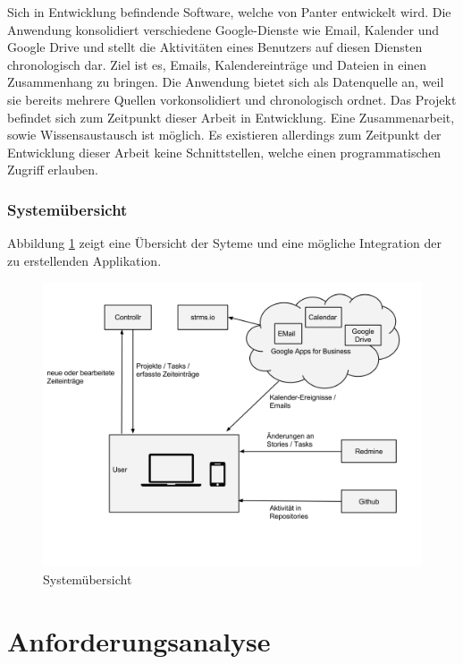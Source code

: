 \documentclass[]{article}
\begin{document}
Sich in Entwicklung befindende Software, welche von Panter entwickelt
wird. Die Anwendung konsolidiert verschiedene Google-Dienste wie Email,
Kalender und Google Drive und stellt die Aktivitäten eines Benutzers auf
diesen Diensten chronologisch dar. Ziel ist es, Emails, Kalendereinträge
und Dateien in einen Zusammenhang zu bringen. Die Anwendung bietet sich
als Datenquelle an, weil sie bereits mehrere Quellen vorkonsolidiert und
chronologisch ordnet. Das Projekt befindet sich zum Zeitpunkt dieser
Arbeit in Entwicklung. Eine Zusammenarbeit, sowie Wissensaustausch ist
möglich. Es existieren allerdings zum Zeitpunkt der Entwicklung dieser
Arbeit keine Schnittstellen, welche einen programmatischen Zugriff
erlauben.

\subsubsection{Systemübersicht}\label{systemuxfcbersicht}

Abbildung \ref{figSystems} zeigt eine Übersicht der Syteme und eine
mögliche Integration der zu erstellenden Applikation.

\begin{figure}[htbp]
\centering
\includegraphics{../img/systems.png}
\caption{Systemübersicht\label{figSystems}}
\end{figure}

\newpage

\section{Anforderungsanalyse}\label{anforderungsanalyse}
\end{document}
